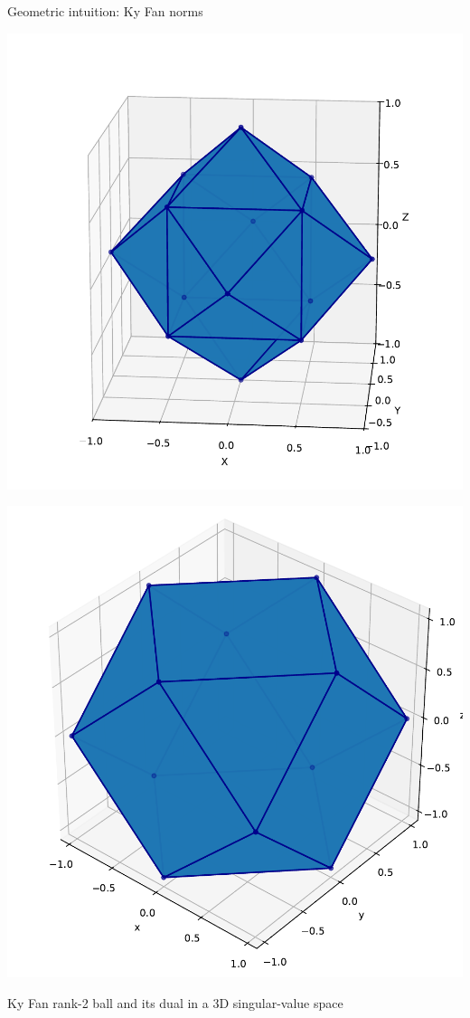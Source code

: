 \documentclass[aspectratio=169]{beamer}
\begin{document}
\begin{frame}{Geometric intuition: Ky Fan norms}
  \centering
  \begin{minipage}{0.46\textwidth}
      \includegraphics[height=0.75\textheight,keepaspectratio]{KyFan.pdf}
  \end{minipage}\hfill
  \begin{minipage}{0.46\textwidth}
      \includegraphics[height=0.75\textheight,keepaspectratio]{KyFanDual.pdf}
  \end{minipage}
  
  \vspace{0.3em}
  \footnotesize Ky Fan rank-2 ball and its dual in a 3D singular-value space
  \end{frame}
\end{document}
